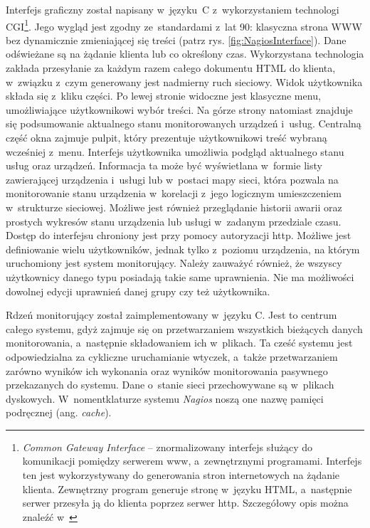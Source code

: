 Interfejs graficzny został napisany w~języku~C z~wykorzystaniem
technologi CGI\footnote{{\em Common Gateway Interface} --
  znormalizowany interfejs służący do komunikacji pomiędzy serwerem
  www, a~zewnętrznymi programami. Interfejs ten jest wykorzystywany do
  generowania stron internetowych na żądanie klienta. Zewnętrzny
  program generuje stronę w~języku HTML, a~następnie serwer przesyła
  ją do klienta poprzez serwer http. Szczegółowy opis można znaleźć
  w~\cite{www:CGI}}. Jego wygląd jest zgodny ze~standardami z~lat 90:
klasyczna strona WWW bez dynamicznie zmieniającej się treści (patrz
rys. \ref{fig:NagiosInterface}). Dane odświeżane są na żądanie klienta
lub co określony czas. Wykorzystana technologia zakłada przesyłanie za
każdym razem całego dokumentu HTML do klienta, w~związku z~czym
generowany jest nadmierny ruch sieciowy. Widok użytkownika składa się
z~kliku części. Po lewej stronie widoczne jest klasyczne menu,
umożliwiające użytkownikowi wybór treści. Na górze strony natomiast
znajduje się podsumowanie aktualnego stanu monitorowanych urządzeń
i~usług. Centralną część okna zajmuje pulpit, który prezentuje
użytkownikowi treść wybraną wcześniej z~menu. Interfejs użytkownika
umożliwia podgląd aktualnego stanu usług oraz urządzeń. Informacja ta
może być wyświetlana w~formie listy zawierającej urządzenia i~usługi
lub w~postaci mapy sieci, która pozwala na monitorowanie stanu
urządzenia w~korelacji z~jego logicznym umieszczeniem w~strukturze
sieciowej. Możliwe jest również przeglądanie historii awarii oraz
prostych wykresów stanu urządzenia lub usługi w~zadanym przedziale
czasu. Dostęp do interfejsu chroniony jest przy pomocy autoryzacji
http. Możliwe jest definiowanie wielu użytkowników, jednak tylko
z~poziomu urządzenia, na którym uruchomiony jest system
monitorujący. Należy zauważyć również, że wszyscy użytkownicy danego
typu posiadają takie same uprawnienia. Nie ma możliwości dowolnej
edycji uprawnień danej grupy czy też użytkownika.

Rdzeń monitorujący został zaimplementowany w~języku C. Jest to centrum
całego systemu, gdyż zajmuje się on przetwarzaniem wszystkich
bieżących danych monitorowania, a~następnie składowaniem ich
w~plikach. Ta cześć systemu jest odpowiedzialna za cykliczne
uruchamianie wtyczek, a~także przetwarzaniem zarówno wyników ich
wykonania oraz wyników monitorowania pasywnego przekazanych do
systemu. Dane o~stanie sieci przechowywane są w~plikach
dyskowych. W~nomentklaturze systemu {\em Nagios} noszą one nazwę pamięci
podręcznej (ang. {\em cache}).

